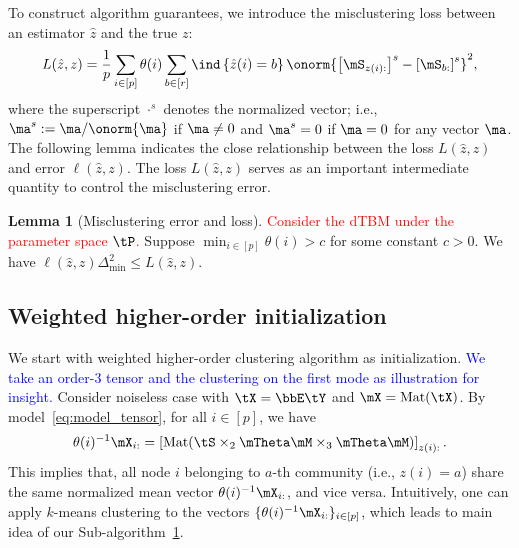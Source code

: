 \documentclass[lettersize,onecolumn,journal]{IEEEtran}
\theoremstyle{definition}
\newtheorem{lem}{Lemma}
\theoremstyle{definition}
\newcommand{\off}[1]{\left[#1\right]}
\newcommand{\offf}[1]{\left\{#1\right\}}
\def\fixme#1#2{\textbf{\color{red}[FIXME (#1): #2]}}
\begin{document}
{
\color{blue}

To construct algorithm guarantees,  we introduce the misclustering loss between an estimator $\hat z$ and the true $z$:
\begin{equation}\label{eq:defnofL}
    L(\hat z, z) = \frac{1}{p}  \sum_{i \in [p]} \theta(i) \sum_{b \in [r]}  \ind \offf{ \hat z(i) = b } \onorm{ \off{ \mS_{ z(i):}  }^s - \off{ \mS_{b:}  }^s  }^2,
\end{equation}
where the superscript $\cdot^{s}$ denotes the normalized vector; i.e., $\ma^s:=\ma/\onorm{\ma}$ if $\ma\neq 0$ and $\ma^{s}=0$ if $\ma=0$ for any vector $\ma$. The following lemma indicates the close relationship between the loss $L(\hat z, z)$ and error $\ell(\hat z, z)$. The loss $L(\hat z, z)$ serves as an important intermediate quantity to control the misclustering error.

\begin{lem}[Misclustering error and loss]\label{lem:mis}  \textcolor{red}{Consider the dTBM under the parameter space $\tP$.} Suppose $\min_{i \in [p]}\theta(i) > c$ for some constant $c > 0$. We have $\ell(\hat z, z) \Delta_{\min}^2 \leq L(\hat z, z)$.
\end{lem}

}

\subsection{Weighted higher-order initialization}

We start with weighted higher-order clustering algorithm as initialization. \textcolor{blue}{We take an order-3 tensor and the clustering on the first mode as illustration for insight.} Consider noiseless case with $\tX = \bbE\tY$ and $\mX = \text{Mat}(\tX)$. 
By model~\eqref{eq:model_tensor}, for all $i \in [p]$, we have
\begin{equation}\label{eq:kmeans}
    \theta(i)^{-1} \mX_{i:} = \off{\text{Mat}( \tS \times_2 \mTheta \mM \times_3  \mTheta \mM )}_{z(i):}. 
\end{equation}
This implies that, all node $i$ belonging to $a$-th community (i.e., $z(i)=a$) share the same normalized mean vector $\theta(i)^{-1} \mX_{i:}$, and vice versa. Intuitively, one can apply $k$-means clustering to the vectors $\{ \theta(i)^{-1} \mX_{i:} \}_{i\in[p]}$, which leads to main idea of our Sub-algorithm~\hyperref[alg:main]{1}.  
\end{document}
